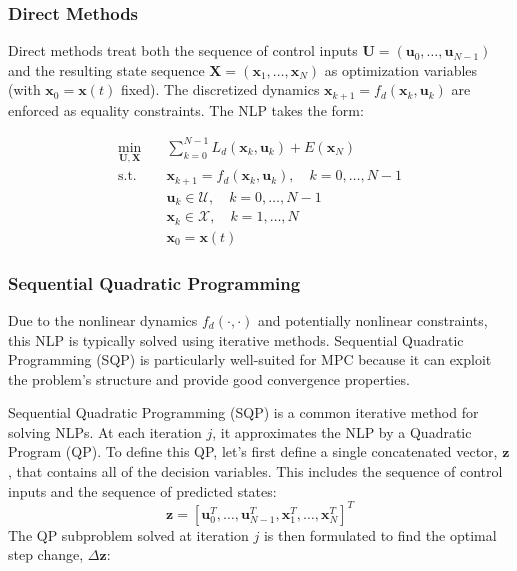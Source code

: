 \subsubsection{Direct Methods}

Direct methods treat both the sequence of control inputs $\mathbf{U} = (\mathbf{u}_0, \dots, \mathbf{u}_{N-1})$ and the resulting state sequence $\mathbf{X} = (\boldsymbol{x}_1, \dots, \boldsymbol{x}_N)$ as optimization variables (with $\boldsymbol{x}_0 = \boldsymbol{x}(t)$ fixed). The discretized dynamics $\boldsymbol{x}_{k+1} = f_d(\boldsymbol{x}_k, \mathbf{u}_k)$ are enforced as equality constraints. The NLP takes the form:

\begin{equation}
\begin{aligned}
\min_{\mathbf{U}, \mathbf{X}} \quad & \sum_{k=0}^{N-1} L_d(\boldsymbol{x}_k, \mathbf{u}_k) + E(\boldsymbol{x}_N) \\
\text{s.t.} \quad & \boldsymbol{x}_{k+1} = f_d(\boldsymbol{x}_k, \mathbf{u}_k), \quad k=0, \dots, N-1 \\
& \mathbf{u}_k \in \mathcal{U}, \quad k=0, \dots, N-1 \\
& \boldsymbol{x}_k \in \mathcal{X}, \quad k=1, \dots, N \\
& \boldsymbol{x}_0 = \boldsymbol{x}(t)
\end{aligned}
\end{equation}


\subsubsection{Sequential Quadratic Programming}

Due to the nonlinear dynamics $f_d(\cdot,\cdot)$ and potentially nonlinear constraints, this NLP is typically solved using iterative methods. Sequential Quadratic Programming (SQP) is particularly well-suited for MPC because it can exploit the problem's structure and provide good convergence properties.

Sequential Quadratic Programming (SQP) is a common iterative method for solving NLPs. At each iteration $j$, it approximates the NLP by a Quadratic Program (QP). To define this QP, let's first define a single concatenated vector, $\boldsymbol{z}$, that contains all of the decision variables. This includes the sequence of control inputs and the sequence of predicted states:
$$
\boldsymbol{z} = [\mathbf{u}_0^T, \dots, \mathbf{u}_{N-1}^T, \boldsymbol{x}_1^T, \dots, \boldsymbol{x}_N^T]^T
$$
The QP subproblem solved at iteration $j$ is then formulated to find the optimal step change, $\Delta\boldsymbol{z}$:

